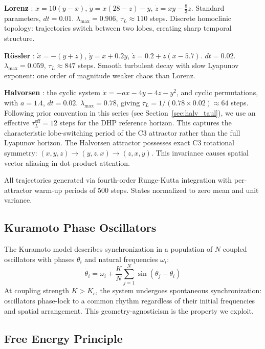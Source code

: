 \documentclass[12pt]{article}
\theoremstyle{definition}
\begin{document}
\textbf{Lorenz} \citep{lorenz1963deterministic}: $\dot{x} = 10(y-x)$,
$\dot{y} = x(28-z)-y$, $\dot{z} = xy - \frac{8}{3}z$. Standard parameters, $dt=0.01$.
$\lambda_{\max} = 0.906$, $\tau_L \approx 110$ steps. Discrete homoclinic topology:
trajectories switch between two lobes, creating sharp temporal structure.

\textbf{R\"{o}ssler} \citep{rossler1976equation}: $\dot{x} = -(y+z)$, $\dot{y} = x + 0.2y$,
$\dot{z} = 0.2 + z(x-5.7)$. $dt=0.02$. $\lambda_{\max} = 0.059$, $\tau_L \approx 847$
steps. Smooth turbulent decay with slow Lyapunov exponent: one order of magnitude
weaker chaos than Lorenz.

\textbf{Halvorsen} \citep{halvorsen2010novel}: the cyclic system
$\dot{x} = -ax - 4y - 4z - y^2$, and cyclic permutations, with $a=1.4$, $dt=0.02$.
$\lambda_{\max} = 0.78$, giving $\tau_L = 1/(0.78 \times 0.02) \approx 64$ steps. Following prior convention in this series (see Section~\ref{sec:halv_taul}), we use an effective $\tau_L^{\text{eff}} = 12$ steps for the DHP reference horizon. This captures the characteristic lobe-switching period of the C3 attractor rather than the full Lyapunov horizon.
The Halvorsen attractor possesses exact C3 rotational symmetry:
$(x,y,z) \to (y,z,x) \to (z,x,y)$. This invariance causes spatial vector aliasing
in dot-product attention.

All trajectories generated via fourth-order Runge-Kutta integration with per-attractor
warm-up periods of 500 steps. States normalized to zero mean and unit variance.

\subsection{Kuramoto Phase Oscillators}

The Kuramoto model \citep{kuramoto1975self} describes synchronization in a population
of $N$ coupled oscillators with phases $\theta_i$ and natural frequencies $\omega_i$:
\begin{equation}
  \dot{\theta}_i = \omega_i + \frac{K}{N} \sum_{j=1}^{N} \sin(\theta_j - \theta_i)
\end{equation}
At coupling strength $K > K_c$, the system undergoes spontaneous synchronization:
oscillators phase-lock to a common rhythm regardless of their initial frequencies and
spatial arrangement. This geometry-agnosticism is the property we exploit.

\subsection{Free Energy Principle}
\end{document}
